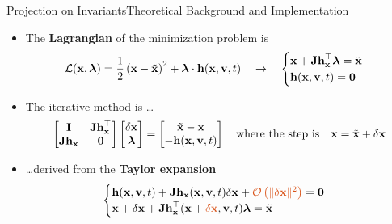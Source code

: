 \begin{frame}{Projection on Invariants}{Theoretical Background and Implementation}
  \begin{itemize}
    \item The \textbf{Lagrangian} of the minimization problem is
    \begin{equation*}
      \mathcal{L}(\mathbf{x}, \boldsymbol{\lambda}) = \frac{1}{2}\left(\mathbf{x} - \tilde{\mathbf{x}}\right)^2 + \boldsymbol{\lambda} \cdot \mathbf{h}(\mathbf{x}, \mathbf{v}, t)
      \quad \rightarrow \quad
      \begin{cases}
        \mathbf{x} + \mathbf{Jh}_{\mathbf{x}}^\top \boldsymbol{\lambda} = \tilde{\mathbf{x}} \\
        \mathbf{h}(\mathbf{x}, \mathbf{v}, t) = \mathbf{0}
      \end{cases}
    \end{equation*}
    \item The iterative method is \dots
    \begin{equation*}
      \begin{bmatrix}
        \mathbf{I}        & \mathbf{Jh}_{\mathbf{x}}^\top \\
        \mathbf{Jh}_{\mathbf{x}} & \mathbf{0}
      \end{bmatrix}
      \begin{bmatrix}
        \delta\mathbf{x} \\
        \boldsymbol{\lambda}
      \end{bmatrix} = \begin{bmatrix}
        \tilde{\mathbf{x}} - \mathbf{x} \\
        -\mathbf{h}(\mathbf{x}, \mathbf{v}, t)
      \end{bmatrix} \quad \text{where the step is} \quad \mathbf{x} = \tilde{\mathbf{x}} + \delta\mathbf{x}
    \end{equation*}
    \item[] \dots derived from the \textbf{Taylor expansion}
    \begin{equation*}
      \begin{cases}
        \mhv + \m{Jh}_{\mx}(\mx, \m{v}, t) \delta\mx + \textcolor{mycolor2}{\mathcal{O}\left(\| \delta\mx \|^2\right)} = \m{0} \\
        \mx + \delta\mx + \m{Jh}_{\mx}^{\top}(\mx + \textcolor{mycolor2}{\delta \mx}, \m{v}, t) \boldsymbol{\lambda} = \tilde{\mx}
      \end{cases}
    \end{equation*}
  \end{itemize}
\end{frame}

